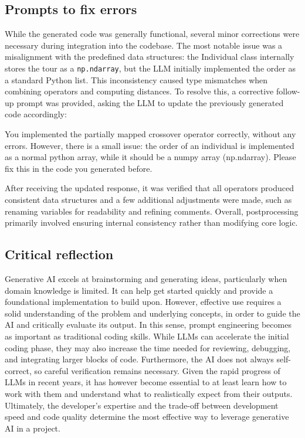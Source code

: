 \documentclass[a4paper,10pt]{article}
\begin{document}

\subsection{Prompts to fix errors}

While the generated code was generally functional, several minor corrections were necessary during integration into the codebase. The most notable issue was a misalignment with the predefined data structures: the Individual class internally stores the tour as a \texttt{np.ndarray}, but the LLM initially implemented the order as a standard Python list. This inconsistency caused type mismatches when combining operators and computing distances. To resolve this, a corrective follow-up prompt was provided, asking the LLM to update the previously generated code accordingly:

\begin{dialogue}
	You implemented the partially mapped crossover operator correctly, without any errors. However, there is a small issue: the order of an individual is implemented as a normal python array, while it should be a numpy array (np.ndarray). Please fix this in the code you generated before.
\end{dialogue}

\noindent
After receiving the updated response, it was verified that all operators produced consistent data structures and a few additional adjustments were made, such as renaming variables for readability and refining comments. Overall, postprocessing primarily involved ensuring internal consistency rather than modifying core logic.

\subsection{Critical reflection}


Generative AI excels at brainstorming and generating ideas, particularly when domain knowledge is limited. It can help get started quickly and provide a foundational implementation to build upon. However, effective use requires a solid understanding of the problem and underlying concepts, in order to guide the AI and critically evaluate its output. In this sense, prompt engineering becomes as important as traditional coding skills. While LLMs can accelerate the initial coding phase, they may also increase the time needed for reviewing, debugging, and integrating larger blocks of code. Furthermore, the AI does not always self-correct, so careful verification remains necessary. Given the rapid progress of LLMs in recent years, it has however become essential to at least learn how to work with them and understand what to realistically expect from their outputs. Ultimately, the developer's expertise and the trade-off between development speed and code quality determine the most effective way to leverage generative AI in a project.
\end{document}
